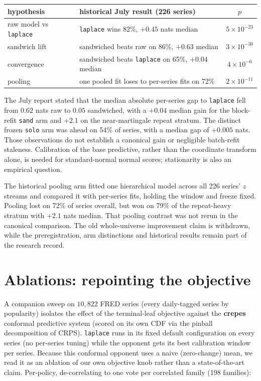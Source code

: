 \documentclass[article]{jss}
\providecommand{\proglang}[1]{\textsf{#1}}
\providecommand{\pkg}[1]{\textbf{#1}}
\providecommand{\code}[1]{\texttt{#1}}
\begin{document}
\begin{center}
\begin{tabular}{llc}
\hline
hypothesis & historical July result (226 series) & $p$ \\
\hline
raw model vs \code{laplace} & \code{laplace} wins 82\%, $+0.45$ nats median & $5\!\times\!10^{-23}$ \\
sandwich lift & sandwiched beats raw on 86\%, $+0.63$ median & $3\!\times\!10^{-30}$ \\
convergence & sandwiched beats \code{laplace} on 65\%, $+0.04$ median & $4\!\times\!10^{-6}$ \\
pooling & one pooled fit loses to per-series fits on 72\% & $2\!\times\!10^{-11}$ \\
\hline
\end{tabular}
\end{center}

The July report stated that the median absolute per-series gap to
\code{laplace} fell from $0.62$ nats raw to $0.05$ sandwiched, with a
$+0.04$ median gain for the block-refit \code{sand} arm and $+2.1$ on
the near-martingale repeat stratum. The distinct frozen \code{solo}
arm was ahead on 54\% of series, with a median gap of $+0.005$ nats.
Those observations do not establish a canonical gain or negligible
batch-refit staleness. Calibration of the base predictive, rather than
the coordinate transform alone, is needed for standard-normal normal
scores; stationarity is also an empirical question.

The historical pooling arm fitted one hierarchical model across all
226 series' $z$ streams and compared it with per-series fits, holding
the window and freeze fixed. Pooling lost on 72\% of series overall,
but won on 79\% of the repeat-heavy stratum with $+2.1$ nats median.
That pooling contrast was not rerun in the canonical comparison.
The old whole-universe improvement claim is withdrawn, while the
preregistration, arm distinctions and historical results remain part
of the research record.

\section{Ablations: repointing the objective} \label{sec:ablations}

A companion sweep on $10{,}822$ \proglang{FRED} series (every daily-tagged series
by popularity) isolates the effect of the terminal-leaf objective against the
\pkg{crepes} conformal predictive system (scored on its own CDF via the pinball
decomposition of CRPS). \code{laplace} runs in its fixed default configuration on
every series (no per-series tuning) while the opponent gets its best
calibration window per series. Because this conformal opponent uses a naive
(zero-change) mean, we read it as an ablation of our own objective knob rather
than a state-of-the-art claim. Per-policy, de-correlating to one vote per
correlated family (198 families):
\end{document}
